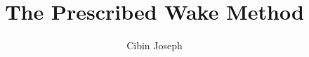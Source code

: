 \documentclass[11pt]{beamer}
\begin{document}
	\author{Cibin Joseph}
	\title{The Prescribed Wake Method}
	\date{}
	\begin{frame}[plain]
	\maketitle
\end{frame}

\begin{frame}
\frametitle{}
\end{frame}
\end{document}
